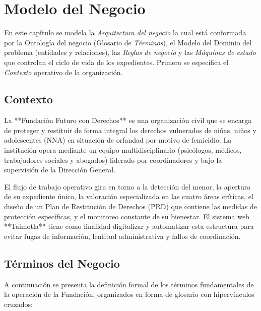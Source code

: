 \chapter{Modelo del Negocio}	
\label{cap:reqSist}

En este capítulo se modela la {\em Arquitectura del negocio} la cual está conformada por la Ontología del negocio (Glosario de {\em Términos}), el Modelo del Dominio del problema (entidades y relaciones), las {\em Reglas de negocio} y las {\em Máquinas de estado} que controlan el ciclo de vida de los expedientes. Primero se especifica el {\em Contexto} operativo de la organización.

\section{Contexto}

La **Fundación Futuro con Derechos** es una organización civil que se encarga de proteger y restituir de forma integral los derechos vulnerados de niñas, niños y adolescentes (NNA) en situación de orfandad por motivo de femicidio. La institución opera mediante un equipo multidisciplinario (psicólogos, médicos, trabajadores sociales y abogados) liderado por coordinadores y bajo la supervisión de la Dirección General. 

El flujo de trabajo operativo gira en torno a la detección del menor, la apertura de su expediente único, la valoración especializada en las cuatro áreas críticas, el diseño de un Plan de Restitución de Derechos (PRD) que contiene las medidas de protección específicas, y el monitoreo constante de su bienestar. El sistema web **Taimotla** tiene como finalidad digitalizar y automatizar esta estructura para evitar fugas de información, lentitud administrativa y fallos de coordinación.

\section{Términos del Negocio}
\label{sec:terminosDeNegocio}

A continuación se presenta la definición formal de los términos fundamentales de la operación de la Fundación, organizados en forma de glosario con hipervínculos cruzados:

